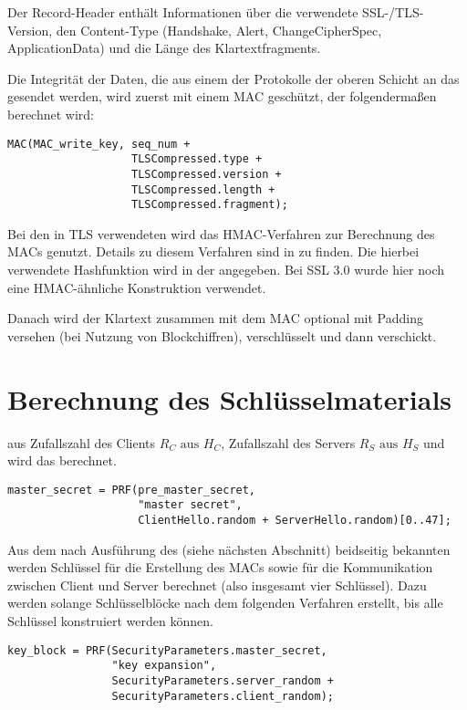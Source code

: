 Der Record-Header enthält Informationen über die verwendete SSL-/TLS-Version, den Content-Type (Handshake, Alert, ChangeCipherSpec, ApplicationData) und die Länge des Klartextfragments.


Die Integrität der Daten, die aus einem der Protokolle der oberen Schicht an das \recordprotocol{} gesendet werden, wird zuerst mit einem MAC geschützt, der folgendermaßen berechnet wird:
\begin{lstlisting}
MAC(MAC_write_key, seq_num +
				   TLSCompressed.type +
				   TLSCompressed.version +
				   TLSCompressed.length +
				   TLSCompressed.fragment);
\end{lstlisting}
Bei den in TLS verwendeten \ciphersuites{} wird das HMAC-Verfahren zur Berechnung des MACs genutzt. Details zu diesem Verfahren sind in \cite{hmac97} zu finden. Die hierbei verwendete Hashfunktion wird in der \ciphersuite{} angegeben. Bei SSL 3.0 wurde hier noch eine HMAC-ähnliche Konstruktion verwendet.

Danach wird der Klartext zusammen mit dem MAC optional mit Padding versehen (bei Nutzung von Blockchiffren), verschlüsselt und dann verschickt.


\section{Berechnung des Schlüsselmaterials}

aus Zufallszahl des Clients \(R_C \text{ aus } H_C\), Zufallszahl des Servers \(R_S \text{ aus } H_S\) und \premastersecret{} wird das \mastersecret{} berechnet.
\begin{lstlisting}
master_secret = PRF(pre_master_secret, 
					"master secret",
					ClientHello.random + ServerHello.random)[0..47];
\end{lstlisting}

Aus dem nach Ausführung des \handshakeprotocol{} (siehe nächsten Abschnitt) beidseitig bekannten \mastersecret{} werden Schlüssel für die Erstellung des MACs sowie für die Kommunikation zwischen Client und Server berechnet (also insgesamt vier Schlüssel). Dazu werden solange Schlüsselblöcke nach dem folgenden Verfahren erstellt, bis alle Schlüssel konstruiert werden können. 

\begin{lstlisting}
key_block = PRF(SecurityParameters.master_secret,
                "key expansion",
                SecurityParameters.server_random +
                SecurityParameters.client_random);
\end{lstlisting}

